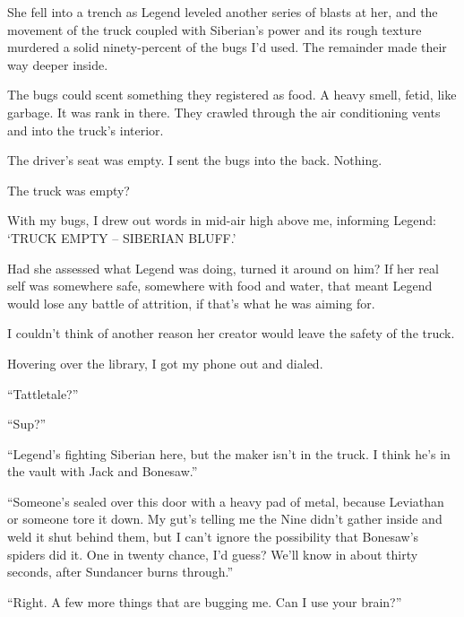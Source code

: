She fell into a trench as Legend leveled another series of blasts at her, and the movement of the truck coupled with Siberian's power and its rough texture murdered a solid ninety-percent of the bugs I'd used.  The remainder made their way deeper inside.



The bugs could scent something they registered as food.  A heavy smell, fetid, like garbage.  It was rank in there.  They crawled through the air conditioning vents and into the truck's interior.



The driver's seat was empty.  I sent the bugs into the back.  Nothing.



The truck was empty?



With my bugs, I drew out words in mid-air high above me, informing Legend: `TRUCK EMPTY – SIBERIAN BLUFF.'



Had she assessed what Legend was doing, turned it around on him?  If her real self was somewhere safe, somewhere with food and water, that meant Legend would lose any battle of attrition, if that's what he was aiming for.



I couldn't think of another reason her creator would leave the safety of the truck.



Hovering over the library, I got my phone out and dialed.



``Tattletale?''



``Sup?''



``Legend's fighting Siberian here, but the maker isn't in the truck.  I think he's in the vault with Jack and Bonesaw.''



``Someone's sealed over this door with a heavy pad of metal, because Leviathan or someone tore it down.  My gut's telling me the Nine didn't gather inside and weld it shut behind them, but I can't ignore the possibility that Bonesaw's spiders did it.  One in twenty chance, I'd guess?  We'll know in about thirty seconds, after Sundancer burns through.''



``Right.  A few more things that are bugging me.  Can I use your brain?''



